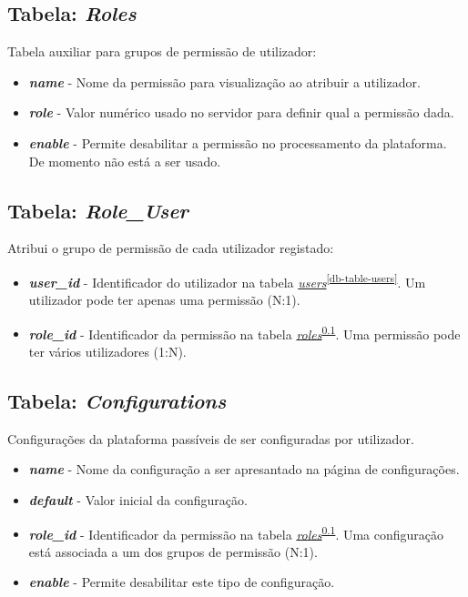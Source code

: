 \documentclass[11pt, a4paper, sans]{article}
\begin{document}
	\subsection{Tabela: \textit{Roles}} \label{db-table-roles}

	Tabela auxiliar para grupos de permissão de utilizador:

	\begin{itemize}
		\item \textbf{\textit{name}} - Nome da permissão para visualização ao atribuir a utilizador.
		\item \textbf{\textit{role}} - Valor numérico usado no servidor para definir qual a permissão dada.
		\item \textbf{\textit{enable}} - Permite desabilitar a permissão no processamento da plataforma. 
			De momento não está a ser usado.
	\end{itemize}

	\subsection{Tabela: \textit{Role\_User}} \label{db-table-role-user}

	Atribui o grupo de permissão de cada utilizador registado:

	\begin{itemize}
		\item \textbf{\textit{user\_id}} - Identificador do utilizador na tabela \underline{\textit{users}}\textsuperscript{\ref{db-table-users}}. Um utilizador pode ter apenas uma permissão (N:1).
		\item \textbf{\textit{role\_id}} - Identificador da permissão na tabela \underline{\textit{roles}}\textsuperscript{\ref{db-table-roles}}. Uma permissão pode ter vários utilizadores (1:N).
	\end{itemize}

	\subsection{Tabela: \textit{Configurations}} \label{db-table-configurations}

	Configurações da plataforma passíveis de ser configuradas por utilizador.

	\begin{itemize}
		\item \textbf{\textit{name}} - Nome da configuração a ser apresantado na página de configurações.
		\item \textbf{\textit{default}} - Valor inicial da configuração.
		\item \textbf{\textit{role\_id}} - Identificador da permissão na tabela \underline{\textit{roles}}\textsuperscript{\ref{db-table-roles}}. Uma configuração está associada a um dos grupos de permissão (N:1).
		\item \textbf{\textit{enable}} - Permite desabilitar este tipo de configuração.
	\end{itemize}
\end{document}

